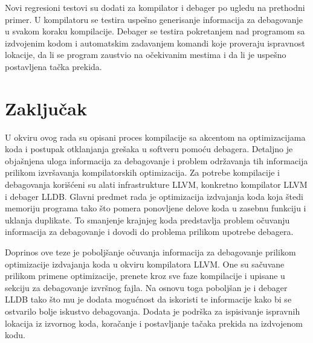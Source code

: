\documentclass[12pt,oneside]{memoir}
\begin{document}
Novi regresioni testovi su dodati za kompilator i debager po ugledu na prethodni primer.
U kompilatoru se testira uspešno generisanje informacija za debagovanje u svakom koraku kompilacije.
Debager se testira pokretanjem nad programom sa izdvojenim kodom i automatskim zadavanjem komandi koje proveraju ispravnost lokacije, da li se program zaustvio na očekivanim mestima i da li je uspešno postavljena tačka prekida.


\chapter{Zaključak}
\label{sec:conclusion}

U okviru ovog rada su opisani proces kompilacije sa akcentom na optimizacijama koda i postupak otklanjanja grešaka u softveru pomoću debagera.
Detaljno je objašnjena uloga informacija za debagovanje i problem održavanja tih informacija prilikom izvršavanja kompilatorskih optimizacija.
Za potrebe kompilacije i debagovanja korišćeni su alati infrastrukture LLVM, konkretno kompilator LLVM i debager LLDB.
Glavni predmet rada je optimizacija izdvajanja koda koja štedi memoriju programa tako što pomera ponovljene delove koda u zasebnu funkciju i uklanja duplikate.
To smanjenje krajnjeg koda predstavlja problem očuvanju informacija za debagovanje i dovodi do problema prilikom upotrebe debagera.

Doprinos ove teze je poboljšanje očuvanja informacija za debagovanje prilikom optimizacije izdvajanja koda u okviru kompilatora LLVM.
One su sačuvane prilikom primene optimizacije, prenete kroz sve faze kompilacije i upisane u sekciju za debagovanje izvršnog fajla.
Na osnovu toga poboljšan je i debager LLDB tako što mu je dodata mogućnost da iskoristi te informacije kako bi se ostvarilo bolje iskustvo debagovanja.
Dodata je podrška za ispisivanje ispravnih lokacija iz izvornog koda, koračanje i postavljanje tačaka prekida na izdvojenom kodu.
\end{document}
